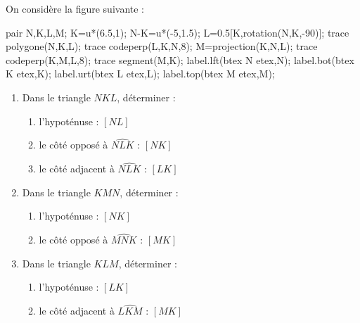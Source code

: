 \begin{corrige}
    On considère la figure suivante :

    \begin{Geometrie}[CoinHD={(7.5u,4.5u)}]        
        pair N,K,L,M;
        K=u*(6.5,1);
        N-K=u*(-5,1.5);
        L=0.5[K,rotation(N,K,-90)];
        trace polygone(N,K,L);            
        trace codeperp(L,K,N,8);
        M=projection(K,N,L);
        trace codeperp(K,M,L,8);
        trace segment(M,K);
        label.lft(btex N etex,N);
        label.bot(btex  K etex,K);
        label.urt(btex L etex,L);
        label.top(btex M etex,M);
    \end{Geometrie}

    \begin{enumerate}
        \item Dans le triangle $NKL$, déterminer :
        \begin{enumerate}
            \item l'hypoténuse : {\red  $[NL]$}
            \item le côté opposé à $\widehat{NLK}$ : {\red  $[NK]$}
            \item le côté adjacent à $\widehat{NLK}$ : {\red  $[LK]$}
        \end{enumerate}
        \setcounter{enumi}{1}
        \item Dans le triangle $KMN$, déterminer :
        \begin{enumerate}
            \item l'hypoténuse : {\red  $[NK]$}
            \item le côté opposé à $\widehat{MNK}$ : {\red  $[MK]$}
        \end{enumerate} 
        \setcounter{enumi}{2}
        \item Dans le triangle $KLM$, déterminer :
        \begin{enumerate}
            \item l'hypoténuse : {\red  $[LK]$}
            \item le côté adjacent à $\widehat{LKM}$ : {\red  $[MK]$}
        \end{enumerate}             
    \end{enumerate}
\end{corrige}

